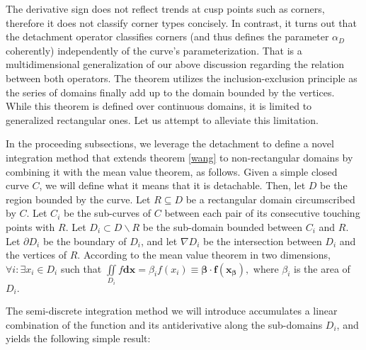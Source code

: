 \documentclass[11pt]{book}
\begin{document}
The derivative sign does not reflect trends at cusp points such as corners, therefore it does not classify corner types concisely. In contrast, it turns out that the detachment operator classifies corners (and thus defines the parameter $\alpha_{D}$ coherently) independently of the curve’s parameterization. That is a multidimensional generalization of our above discussion regarding the relation between both operators.  The theorem utilizes the inclusion-exclusion principle as the series of domains finally add up to the domain bounded by the vertices. While this theorem is defined over continuous domains, it is limited to generalized rectangular ones. Let us attempt to alleviate this limitation.

In the proceeding subsections, we leverage the detachment to define a novel integration method that extends theorem \ref{wang} to non-rectangular domains by combining it with the mean value theorem, as follows. Given a simple closed curve $C$, we will define what it means that it is detachable. Then, let $D$ be the region bounded by the curve. Let $R\subseteq D$ be a rectangular domain circumscribed by $C$. Let ${C_i}$ be the sub-curves of $C$ between each pair of its consecutive touching points with $R.$ Let $D_{i}\subset D\backslash R$ be the sub-domain bounded between $C_i$ and $R$. Let $\partial D_i$ be the boundary of $D_i$, and let $\nabla D_{i}$ be the intersection between $D_i$ and the vertices of $R$. According to the mean value theorem in two dimensions, $\forall i:\exists x_{i}\in D_{i}$ such that $\underset{{\scriptscriptstyle D_{i}}}{\iint}f\boldsymbol{dx}=\beta_{i}f\left(x_{i}\right)\equiv\boldsymbol{\beta}\cdot\boldsymbol{f\left(x_{\beta}\right)},$ where $\beta_{i}$ is the area of $D_{i}.$

The semi-discrete integration method we will introduce accumulates a linear combination of the function and its antiderivative along the sub-domains $D_{i}$, and yields the following simple result:
\end{document}
